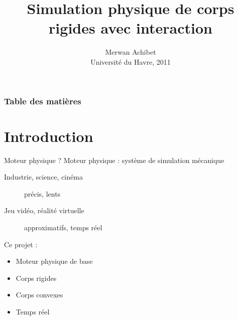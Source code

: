 \documentclass{beamer}
\title{Simulation physique de corps rigides avec interaction}
\author{Merwan Achibet\\ Université du Havre, 2011}
\date{}
\begin{document}
\shorthandoff{!} %


\begin{frame}
  \maketitle
\end{frame}

\setcounter{framenumber}{0}
\begin{frame}
  \frametitle{Table des matières}
  \tableofcontents
\end{frame}

\section{Introduction}

\begin{frame}{Moteur physique ?}
  Moteur physique : système de simulation mécanique
  \begin{description}
  \item[Industrie, science, cinéma] précis, lents
  \item[Jeu vidéo, réalité virtuelle] approximatifs, temps réel
  \end{description}

  \vfill
  
  Ce projet :
  \begin{itemize}
  \item Moteur physique de base 
  \item Corps rigides
  \item Corps convexes
  \item Temps réel
  \end{itemize}
\end{frame}
\end{document}
